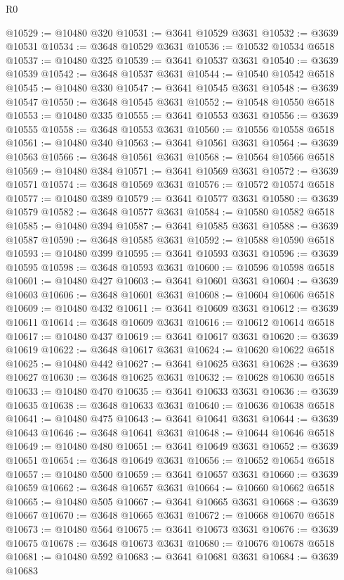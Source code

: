 \begin{lexlean}{R0}
\begin{coremodule}
@10529 := @10480 @320
@10531 := @3641 @10529 @3631
@10532 := @3639 @10531
@10534 := @3648 @10529 @3631
@10536 := @10532 @10534 @6518
@10537 := @10480 @325
@10539 := @3641 @10537 @3631
@10540 := @3639 @10539
@10542 := @3648 @10537 @3631
@10544 := @10540 @10542 @6518
@10545 := @10480 @330
@10547 := @3641 @10545 @3631
@10548 := @3639 @10547
@10550 := @3648 @10545 @3631
@10552 := @10548 @10550 @6518
@10553 := @10480 @335
@10555 := @3641 @10553 @3631
@10556 := @3639 @10555
@10558 := @3648 @10553 @3631
@10560 := @10556 @10558 @6518
@10561 := @10480 @340
@10563 := @3641 @10561 @3631
@10564 := @3639 @10563
@10566 := @3648 @10561 @3631
@10568 := @10564 @10566 @6518
@10569 := @10480 @384
@10571 := @3641 @10569 @3631
@10572 := @3639 @10571
@10574 := @3648 @10569 @3631
@10576 := @10572 @10574 @6518
@10577 := @10480 @389
@10579 := @3641 @10577 @3631
@10580 := @3639 @10579
@10582 := @3648 @10577 @3631
@10584 := @10580 @10582 @6518
@10585 := @10480 @394
@10587 := @3641 @10585 @3631
@10588 := @3639 @10587
@10590 := @3648 @10585 @3631
@10592 := @10588 @10590 @6518
@10593 := @10480 @399
@10595 := @3641 @10593 @3631
@10596 := @3639 @10595
@10598 := @3648 @10593 @3631
@10600 := @10596 @10598 @6518
@10601 := @10480 @427
@10603 := @3641 @10601 @3631
@10604 := @3639 @10603
@10606 := @3648 @10601 @3631
@10608 := @10604 @10606 @6518
@10609 := @10480 @432
@10611 := @3641 @10609 @3631
@10612 := @3639 @10611
@10614 := @3648 @10609 @3631
@10616 := @10612 @10614 @6518
@10617 := @10480 @437
@10619 := @3641 @10617 @3631
@10620 := @3639 @10619
@10622 := @3648 @10617 @3631
@10624 := @10620 @10622 @6518
@10625 := @10480 @442
@10627 := @3641 @10625 @3631
@10628 := @3639 @10627
@10630 := @3648 @10625 @3631
@10632 := @10628 @10630 @6518
@10633 := @10480 @470
@10635 := @3641 @10633 @3631
@10636 := @3639 @10635
@10638 := @3648 @10633 @3631
@10640 := @10636 @10638 @6518
@10641 := @10480 @475
@10643 := @3641 @10641 @3631
@10644 := @3639 @10643
@10646 := @3648 @10641 @3631
@10648 := @10644 @10646 @6518
@10649 := @10480 @480
@10651 := @3641 @10649 @3631
@10652 := @3639 @10651
@10654 := @3648 @10649 @3631
@10656 := @10652 @10654 @6518
@10657 := @10480 @500
@10659 := @3641 @10657 @3631
@10660 := @3639 @10659
@10662 := @3648 @10657 @3631
@10664 := @10660 @10662 @6518
@10665 := @10480 @505
@10667 := @3641 @10665 @3631
@10668 := @3639 @10667
@10670 := @3648 @10665 @3631
@10672 := @10668 @10670 @6518
@10673 := @10480 @564
@10675 := @3641 @10673 @3631
@10676 := @3639 @10675
@10678 := @3648 @10673 @3631
@10680 := @10676 @10678 @6518
@10681 := @10480 @592
@10683 := @3641 @10681 @3631
@10684 := @3639 @10683

\end{coremodule}
\end{lexlean}
